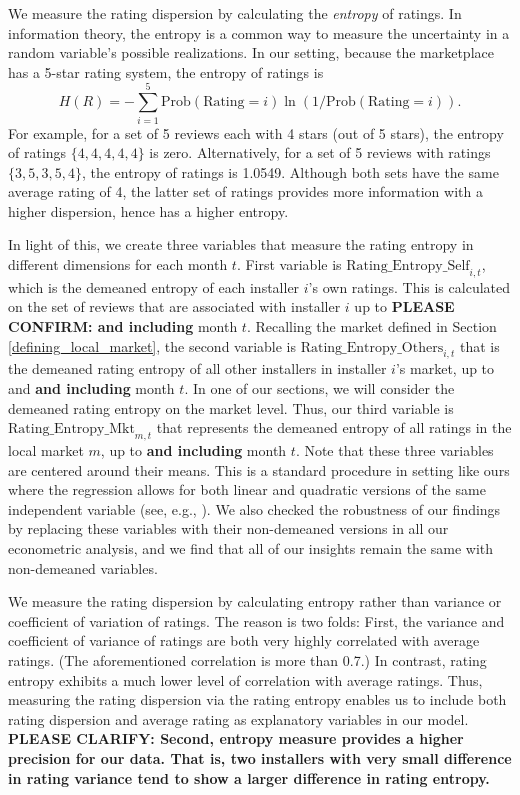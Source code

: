 \documentclass[msom,blindrev]{informs3}
\begin{document}
We measure the rating dispersion by calculating the \emph{entropy} of ratings. In information theory, the entropy is a common way to measure  the uncertainty in a random variable's possible realizations. In our setting, because the marketplace has a 5-star rating system, the entropy of ratings is
\begin{equation}\label{def: entropy}
H(R)=-\sum_{i=1}^{5} \text{Prob}(\text{Rating}=i) \ln(1/\text{Prob}(\text{Rating}=i)).
\end{equation}
For example, for a set of 5 reviews each with 4 stars (out of 5 stars), the entropy of ratings $\{4,4,4,4,4\}$ is zero. Alternatively, for a set of 5 reviews with ratings $\{3,5,3,5,4\}$, the entropy of ratings is 1.0549. Although both sets have the same average rating of 4, the latter set of ratings provides more information with a higher dispersion, hence has a higher entropy.


In light of this, we create three variables that measure the rating entropy in different dimensions for each month $t$. First variable is $\text{Rating\_Entropy\_Self}_{i,t}$, which is the demeaned entropy of each installer $i$'s own ratings. This is calculated on the set of reviews that are associated with installer $i$ up to \textbf{PLEASE CONFIRM: and including} month $t$. Recalling the market defined in Section \ref{defining_local_market}, the second variable is $\text{Rating\_Entropy\_Others}_{i,t}$ that is the demeaned rating entropy of all other installers in installer $i$'s market, up to and \textbf{and including} month $t$. In one of our sections, we will consider the demeaned rating entropy on the market level. Thus, our third variable is $\text{Rating\_Entropy\_Mkt}_{m,t}$ that represents the demeaned entropy of all ratings in the local market $m$, up to  \textbf{and including} month $t$. Note that these three variables are centered around their means. This is a standard procedure in setting like ours where the regression allows for both linear and quadratic versions of the same independent variable (see, e.g., \citep{tan2014does}). We also checked the robustness of our findings by replacing these variables with their non-demeaned versions in all our econometric analysis, and we find that all of our insights remain the same with non-demeaned variables.

We measure the rating dispersion by calculating entropy rather than variance or coefficient of variation of ratings. The reason is two folds: First, the variance and coefficient of variance of ratings are both very highly correlated with average ratings. (The aforementioned correlation is more than 0.7.) In contrast, rating entropy exhibits a much lower level of correlation with average ratings. Thus, measuring the rating dispersion via the rating entropy enables us to include both rating dispersion and average rating as explanatory variables in our model. \textbf{PLEASE CLARIFY: Second, entropy measure provides a higher precision for our data. That is, two installers with very small difference in rating variance tend to show a larger difference in rating entropy.}
\end{document}
